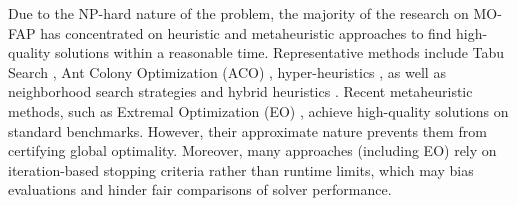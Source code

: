 \documentclass[letterpaper,journal]{IEEEtran}
\begin{document}
Due to the NP-hard nature of the problem, the majority of the research on MO-FAP has concentrated on heuristic and metaheuristic approaches to find high-quality solutions within a reasonable time. 
Representative methods include Tabu Search \cite{Dib2009,Alrajhi2016_Dynamic,Alrajhi2016_Hybridized}, Ant Colony Optimization (ACO) \cite{Alrajhi2023AntMetaheuristic, Alrajhi2023DynamicACO}, hyper-heuristics \cite{Alrajhi2023DynamicHyper}, as well as neighborhood search strategies and hybrid heuristics \cite{Alrajhi2023Neighborhood}.
Recent metaheuristic methods, such as Extremal Optimization (EO) \cite{Gomez2023MO}, achieve high-quality solutions on standard benchmarks. However, their approximate nature prevents them from certifying global optimality. Moreover, many approaches (including EO) rely on iteration-based stopping criteria rather than runtime limits, which may bias evaluations and hinder fair comparisons of solver performance.
\end{document}
